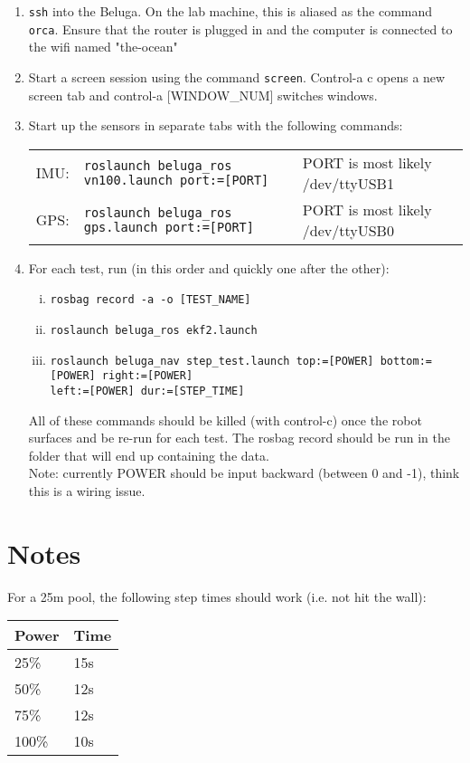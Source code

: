 \documentclass{article}
\begin{document}
\begin{enumerate}
\item{ \texttt{ssh} into the Beluga. 
On the lab machine, this is aliased as the command \texttt{orca}.
Ensure that the router is plugged in and the computer is connected to the wifi named "the-ocean"
}
\item{
Start a screen session using the command \texttt{screen}.
Control-a c opens a new screen tab and control-a [WINDOW\_NUM] switches windows.
}
\item{
Start up the sensors in separate tabs with the following commands: \vspace{-15pt}
\begin{center}
\begin{tabular}{lll}
IMU: & \texttt{roslaunch beluga\_ros vn100.launch port:=[PORT]} & PORT is most likely /dev/ttyUSB1 \\
GPS: & \texttt{roslaunch beluga\_ros gps.launch port:=[PORT]} & PORT is most likely /dev/ttyUSB0 \\
\end{tabular}
\end{center}
}
\item{
For each test, run (in this order and quickly one after the other):
\begin{enumerate}[i.]
\item \texttt{rosbag record -a -o [TEST\_NAME]}
\item \texttt{roslaunch beluga\_ros ekf2.launch}
\item \texttt{roslaunch beluga\_nav step\_test.launch top:=[POWER] bottom:=[POWER] right:=[POWER] \\ left:=[POWER] dur:=[STEP\_TIME]}
\end{enumerate}
All of these commands should be killed (with control-c) once the robot surfaces and be re-run for each test.
The rosbag record should be run in the folder that will end up containing the data. \\
Note: currently POWER should be input backward (between 0 and -1), think this is a wiring issue.
}
\end{enumerate}

\section*{Notes}
For a 25m pool, the following step times should work (i.e. not hit the wall):
\begin{center}
\begin{tabular}{ll}
Power & Time \\ \hline
25\% & 15s \\
50\% & 12s \\
75\% & 12s \\
100\% & 10s \\
\end{tabular}
\end{center}
\end{document}
